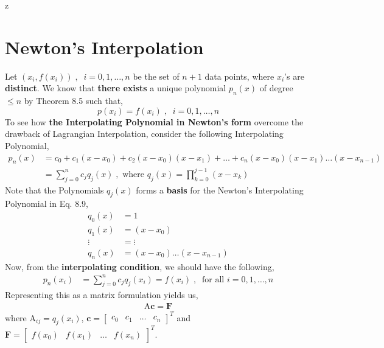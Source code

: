 z\documentclass[a4paper,12pt,twoside]{book}
\newcommand{\vect}[1]{\bm{#1}}
\newcommand{\mat}[1]{\bm{\mathrm{#1}}}
\begin{document}
\section{Newton's Interpolation}
Let $(x_i, f(x_i))\;,\;\;i=0,1,\dots,n$ be the set of $n+1$ data points, where $x_i$'s are \textbf{distinct}. We know that \textbf{there exists} a unique polynomial $p_n(x)$ of degree $\le n$ by Theorem 8.5 such that,
\[ p(x_i) = f(x_i) \;,\;\; i = 0,1,\dots,n\]
To see how \textbf{the Interpolating Polynomial in Newton's form} overcome the drawback of Lagrangian Interpolation, consider the following Interpolating Polynomial,
\begin{equation}
    \begin{split}
        p_n(x) &= c_0 + c_1 (x-x_0) + c_2 (x-x_0)(x-x_1) + \dots + c_n(x-x_0)(x-x_1)\dots(x-x_{n-1})\\
        &= \sum_{j=0}^{n} c_j q_j(x)\;, \text{ where } \boxed{q_j(x) = \prod_{k=0}^{j-1}(x-x_{k})}
    \end{split}
\end{equation}
Note that the Polynomials $q_j(x)$ forms a \textbf{basis} for the Newton's Interpolating Polynomial in Eq. 8.9,
\begin{equation*}
    \begin{split}
        q_0(x) &= 1\\
        q_1(x) &= (x-x_0)\\
        \vdots &= \vdots\\
        q_n(x) &= (x-x_0)\dots(x-x_{n-1})
    \end{split}
\end{equation*}
Now, from the \textbf{interpolating condition}, we should have the following,
\begin{equation}
    \begin{split}
        p_n(x_i) &= \sum_{j=0}^{n} c_j q_j(x_i) = f(x_i) \;,\;\; \text{for all }i = 0,1,\dots,n
    \end{split}
\end{equation}
Representing this as a matrix formulation yields us,
\begin{equation}
    \begin{split}
        \mat{A} \vect{c} = \vect{F}
    \end{split}
\end{equation}
where $\mat{A}_{ij} = q_j(x_i)$, $\vect{c} = \begin{bmatrix} c_0 & c_1 & \dots & c_n\end{bmatrix}^T$ and $\vect{F} = \begin{bmatrix} f(x_0) & f(x_1) & \dots & f(x_n) \end{bmatrix}^T$.
\end{document}
